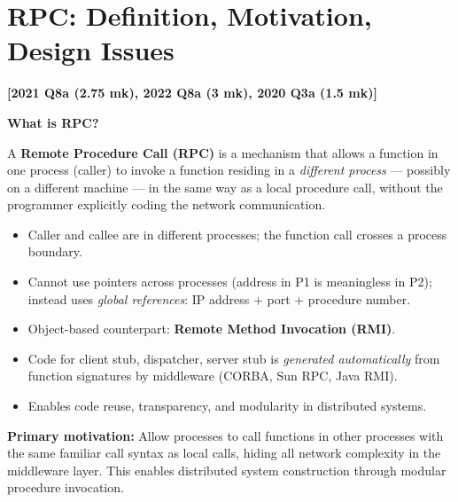 \documentclass[11pt,a4paper]{article}
\newcommand{\qref}[1]{\textbf{\textcolor{examblue}{[#1]}}}
\newcommand{\mk}[1]{\textcolor{slidegray}{\small(#1 mk)}}
\newcommand{\key}[1]{\textbf{\textcolor{keyred}{#1}}}
\begin{document}
\section{RPC: Definition, Motivation, Design Issues}
\qref{2021 Q8a \mk{2.75}, 2022 Q8a \mk{3}, 2020 Q3a \mk{1.5}}

\begin{answerbox}
\textbf{What is RPC?}

A \key{Remote Procedure Call (RPC)} is a mechanism that allows a function in one process (caller) to invoke a function residing in a \emph{different process} --- possibly on a different machine --- in the same way as a local procedure call, without the programmer explicitly coding the network communication.

\begin{itemize}
  \item Caller and callee are in different processes; the function call crosses a process boundary.
  \item Cannot use pointers across processes (address in P1 is meaningless in P2); instead uses \emph{global references}: IP address + port + procedure number.
  \item Object-based counterpart: \textbf{Remote Method Invocation (RMI)}.
  \item Code for client stub, dispatcher, server stub is \emph{generated automatically} from function signatures by middleware (CORBA, Sun RPC, Java RMI).
  \item Enables code reuse, transparency, and modularity in distributed systems.
\end{itemize}

\textbf{Primary motivation:} Allow processes to call functions in other processes with the same familiar call syntax as local calls, hiding all network complexity in the middleware layer. This enables distributed system construction through modular procedure invocation.


\end{answerbox}
\end{document}
